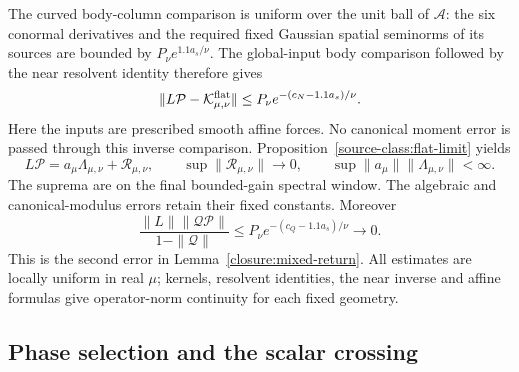 The curved body-column comparison is uniform over the unit ball
of $\mathscr A$: the six conormal derivatives and the required fixed
Gaussian spatial seminorms of its sources are bounded by
$P_\nu e^{1.1a_s/\nu}$. The global-input body comparison followed
by the near resolvent identity therefore gives
\[
 \|L\mathcal P-\mathcal K^{\rm flat}_{\mu,\nu}\|
       \le P_\nu e^{-(c_N-1.1a_s)/\nu}.
\]
Here the inputs are prescribed smooth affine forces. No canonical
moment error is passed through this inverse comparison.
Proposition~\ref{source-class:flat-limit} yields
\begin{equation}\label{closure:K-rank-one}
 L\mathcal P=a_\mu\Lambda_{\mu,\nu}+\mathcal R_{\mu,\nu},
 \qquad \sup\|\mathcal R_{\mu,\nu}\|\longrightarrow0,\qquad
 \sup\|a_\mu\|\|\Lambda_{\mu,\nu}\|<\infty.
\end{equation}
The suprema are on the final bounded-gain spectral window. The
algebraic and canonical-modulus errors retain their fixed constants.
Moreover
\[
 \frac{\|L\|\|\mathcal Q\mathcal P\|}{1-\|\mathcal Q\|}
 \le P_\nu e^{-(c_Q-1.1a_s)/\nu}\longrightarrow0.
\]
This is the second error in Lemma~\ref{closure:mixed-return}.
All estimates are locally uniform in real $\mu$; kernels, resolvent
identities, the near inverse and affine formulas give operator-norm
continuity for each fixed geometry.

\subsection{Phase selection and the scalar crossing}

